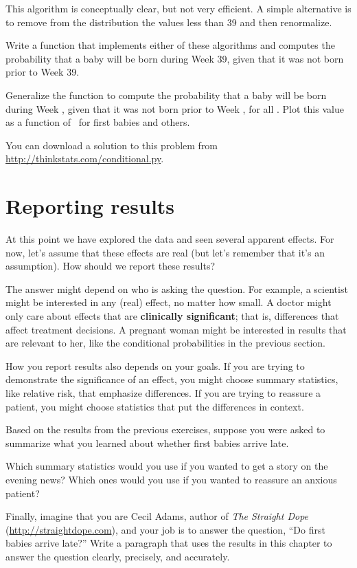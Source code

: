 \documentclass[12pt]{book}
\begin{document}
This algorithm is conceptually clear, but not very efficient.
A simple alternative is to remove from the distribution the values
less than 39 and then renormalize.

\begin{exercise}
Write a function that implements either of these algorithms and
computes the probability that a baby will be born during Week 39,
given that it was not born prior to Week 39.

Generalize the function to compute the
probability that a baby will be born during Week \x, given that
it was not born prior to Week \x, for all \x.
Plot this value as a function of \x~for first babies and others.

You can download a solution to this problem from
\url{http://thinkstats.com/conditional.py}.

\end{exercise}


\section{Reporting results}

At this point we have explored the data and seen several apparent
effects.  For now, let's assume that these effects are real (but let's
remember that it's an assumption).  How should we report these
results?

The answer might depend on who is asking the question.  For example, a
scientist might be interested in any (real) effect, no matter how
small.  A doctor might only care about effects that are {\bf
  clinically significant}; that is, differences that affect treatment
decisions.  A pregnant woman might be interested in results that are
relevant to her, like the conditional probabilities in the previous
section.

How you report results also depends on your goals.  If you are
trying to demonstrate the significance of an effect, you might choose
summary statistics, like relative risk, that emphasize differences.
If you are trying to reassure a patient, you might choose statistics
that put the differences in context.

\begin{exercise}
Based on the results from the previous exercises, suppose you were
asked to summarize what you learned about whether first
babies arrive late.

Which summary statistics would you use if you wanted to get a story
on the evening news?  Which ones would you use if you wanted to
reassure an anxious patient?

Finally, imagine that you are Cecil Adams, author of {\it The Straight
  Dope} (\url{http://straightdope.com}), and your job is to answer the
question, ``Do first babies arrive late?''  Write a paragraph that
uses the results in this chapter to answer the question clearly,
precisely, and accurately.

\end{exercise}
\end{document}
